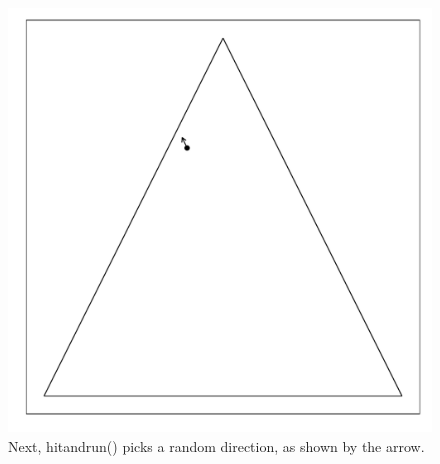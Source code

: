 \documentclass{article}\usepackage{graphicx, color}
\makeatletter
\def\maxwidth{ %
  \ifdim\Gin@nat@width>\linewidth
    \linewidth
  \else
    \Gin@nat@width
  \fi
}
\newenvironment{knitrout}{}{} %
\makeatother
\begin{document}
\begin{figure}[H]
\begin{knitrout}
\color{fgcolor}
\includegraphics[width=\maxwidth]{figure/hitandrun_walkthrough2} 

\end{knitrout}

\caption{Next, hitandrun() picks a random direction, as shown by the arrow.}
\end{figure}
\end{document}
